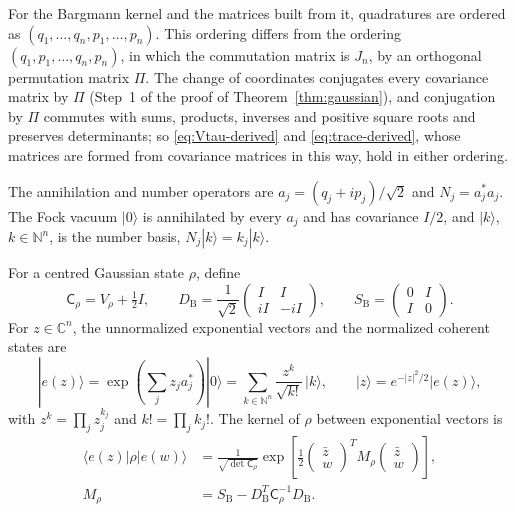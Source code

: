 \documentclass[11pt]{amsart}
\numberwithin{equation}{section}
\theoremstyle{definition}
\newcommand{\C}{\mathbb C}
\newcommand{\N}{\mathbb N}
\begin{document}
For the Bargmann kernel and the matrices built from it, quadratures are ordered as
\((q_1,\ldots,q_n,\allowbreak p_1,\ldots,p_n)\). This ordering differs
from the ordering \((q_1,p_1,\ldots,q_n,p_n)\), in which the commutation
matrix is \(J_n\), by an orthogonal permutation matrix \(\Pi\). The change
of coordinates conjugates every covariance matrix by \(\Pi\) (Step~1 of
the proof of Theorem~\ref{thm:gaussian}), and conjugation by \(\Pi\)
commutes with sums, products, inverses and positive square roots and
preserves determinants; so \eqref{eq:Vtau-derived} and
\eqref{eq:trace-derived}, whose matrices are formed from covariance
matrices in this way, hold in either ordering.

The annihilation and number
operators are \(a_j=(q_j+ip_j)/\sqrt2\) and \(N_j=a_j^*a_j\). The Fock
vacuum \(|0\rangle\) is annihilated by every \(a_j\) and has covariance
\(I/2\), and \(|k\rangle\), \(k\in\N^n\), is the number basis,
\(N_j|k\rangle=k_j|k\rangle\).

For a centred Gaussian state
\(\rho\), define
\[
 \mathsf C_\rho=V_\rho+\tfrac12I,\qquad
 D_{\mathrm B}=\frac1{\sqrt2}
 \begin{pmatrix}I&I\\ iI&-iI\end{pmatrix},\qquad
 S_{\mathrm B}=\begin{pmatrix}0&I\\I&0\end{pmatrix}.
\]
For \(z\in\C^n\), the unnormalized exponential vectors and the
normalized coherent states are
\[
 |e(z)\rangle
 =\exp\!\left(\sum_jz_ja_j^*\right)|0\rangle
 =\sum_{k\in\N^n}\frac{z^k}{\sqrt{k!}}\,|k\rangle,\qquad
 |z\rangle=e^{-|z|^2/2}|e(z)\rangle,
\]
with \(z^k=\prod_jz_j^{k_j}\) and \(k!=\prod_jk_j!\). The kernel of
\(\rho\) between exponential vectors is
\begin{equation}
 \begin{split}
 \langle e(z)|\rho|e(w)\rangle
 &=
 \frac1{\sqrt{\det\mathsf C_\rho}}
 \exp\!\left[
 \frac12
 \begin{pmatrix}\bar z\\w\end{pmatrix}^{\!T}
 M_\rho
 \begin{pmatrix}\bar z\\w\end{pmatrix}
 \right],\\
 M_\rho&=S_{\mathrm B}
       -D_{\mathrm B}^T\mathsf C_\rho^{-1}D_{\mathrm B}.
 \end{split}
 \label{eq:Bargmann}
\end{equation}
\end{document}
